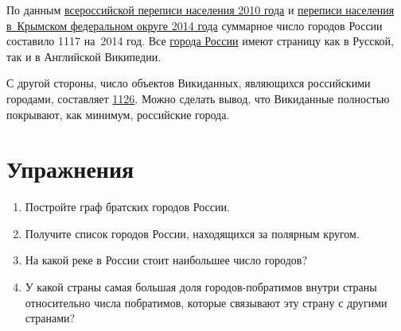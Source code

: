 По данным \href{https://bit.ly/2JPL34b}{всероссийской переписи населения 2010 года}\autocite{city_perepis_2010} 
и \href{https://bit.ly/2Lflc6F}{переписи населения в~Крымском федеральном округе 2014 года}\autocite{city_perepis_2014} 
суммарное число городов России составило \num{1117} на~2014 год. 
Все \href{https://w.wiki/oLE}{города России} имеют страницу как в Русской, так и в Английской Википедии.

С другой стороны, число объектов Викиданных, являющихся российскими городами, 
составляет \href{https://w.wiki/jyP}{\num{1126}}. 
Можно сделать вывод, что Викиданные полностью покрывают, как минимум, российские города. 

\section{Упражнения}

\begin{enumerate}
\item Постройте граф братских городов России.
\item Получите список городов России, находящихся за полярным кругом.
\item На какой реке в России стоит наибольшее число городов?
\item У какой страны самая большая доля городов-побратимов внутри страны относительно числа побратимов, которые связывают эту страну с другими странами?
\end{enumerate}
